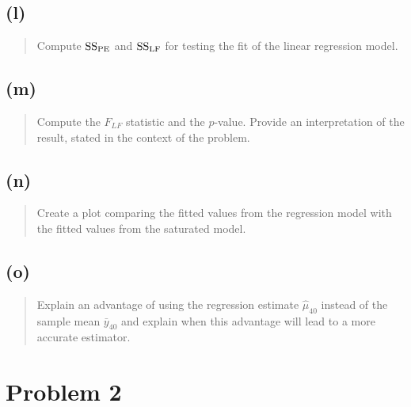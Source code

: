 \documentclass[
]{article}
\begin{document}
\hypertarget{l}{%
\subsection{(l)}\label{l}}

\begin{quote}
Compute \(\mathrm{SS_{PE}}\) and \(\mathrm{SS_{LF}}\) for testing the fit of the linear
regression model.
\end{quote}

\vspace{50pt}

\hypertarget{m}{%
\subsection{(m)}\label{m}}

\begin{quote}
Compute the \(F_{LF}\) statistic and the \(p\)-value. Provide an
interpretation of the result, stated in the context of the problem.
\end{quote}

\vspace{50pt}

\hypertarget{n}{%
\subsection{(n)}\label{n}}

\begin{quote}
Create a plot comparing the fitted values from the regression model with
the fitted values from the saturated model.
\end{quote}

\vspace{50pt}

\hypertarget{o}{%
\subsection{(o)}\label{o}}

\begin{quote}
Explain an advantage of using the regression estimate \(\hat{\mu}_{40}\)
instead of the sample mean \(\bar{y}_{40}\) and explain when this
advantage will lead to a more accurate estimator.
\end{quote}

\vspace{50pt}

\hypertarget{problem-2}{%
\section{Problem 2}\label{problem-2}}
\end{document}
